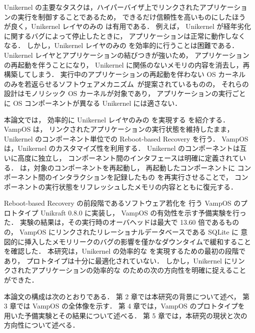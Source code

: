 Unikernel の主要なタスクは，ハイパーバイザ上でリンクされたアプリケーションの実行を制御することであるため，
できるだけ信頼性を高いものにしたほうが良く，Unikernel レイヤのみの
\rr は有用である．
例えば，
Unikernel が経年劣化に関するバグによって停止したときに，
アプリケーションは正常に動作しなくなる．
しかし，Unikernel レイヤのみの \rr を効率的に行うことは困難である．
Unikernel レイヤとアプリケーションの結びつきが強いため，
アプリケーションの再起動を伴うことになり，
Unikernel に関係のないメモリの内容を消去し，再構築してしまう．
実行中のアプリケーションの再起動を伴わない OS カーネルのみを若返らせるソフトウェアメカニズム~\cite{DepoutovitchEtAl-otherworld,TeradaEtAl-Dwarf}が提案されているものの，
それらの設計はモノリシック OS カーネルが対象であり，
アプリケーションの実行ごとに OS コンポーネントが異なる Unikernel には適さない．

本論文では，
効率的に Unikernel レイヤのみの \rr を実現する \emph{\sysname} を紹介する．
VampOS は，
リンクされたアプリケーションの実行状態を維持したまま，
Unikernel のコンポーネント単位での Reboot-based Recovery を行う．
VampOS は，Unikernel のカスタマイズ性を利用する．
Unikernel のコンポーネントは互いに高度に独立し，
コンポーネント間のインタフェースは明確に定義されている．
\sysname は，対象のコンポーネントを再起動し，
再起動したコンポーネントに
コンポーネント間のインタラクションを記録したもの
を再実行させることで，
コンポーネントの実行状態をリフレッシュしたメモリの内容とともに復元する．

Reboot-based Recovery の前段階であるソフトウェア若化を
行う VampOS のプロトタイプ Unikraft 0.8.0 に実装し，
VampOS の有効性を示す予備実験を行った．
実験の結果は，その実行時のオーバヘッドは最大で 13.60 倍であるものの，
VampOS にリンクされたリレーショナルデータベースである SQLite に
意図的に挿入したメモリリークのバグの影響を僅かなダウンタイムで緩和することを確認した．
本研究は，Unikernel の効率的な \rr を実現するための最初の段階であり，
プロトタイプは十分に最適化されていない．
しかし，Unikernel にリンクされたアプリケーションの効率的な \rr のための次の方向性を明確に捉えることができた．

本論文の構成は次のとおりである．
第 2 章では本研究の背景について述べ，
第 3 章では VampOS の全体像を示す．
第 4 章では，VampOS のプロトタイプを用いた予備実験とその結果について述べる．
第 5 章では，本研究の現状と次の方向性について述べる．

